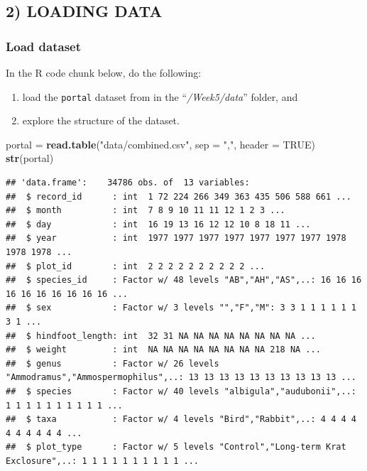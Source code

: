 \documentclass[]{article}
\newenvironment{Shaded}{\begin{snugshade}}{\end{snugshade}}
\newcommand{\KeywordTok}[1]{\textcolor[rgb]{0.13,0.29,0.53}{\textbf{{#1}}}}
\newcommand{\DataTypeTok}[1]{\textcolor[rgb]{0.13,0.29,0.53}{{#1}}}
\newcommand{\StringTok}[1]{\textcolor[rgb]{0.31,0.60,0.02}{{#1}}}
\newcommand{\OtherTok}[1]{\textcolor[rgb]{0.56,0.35,0.01}{{#1}}}
\newcommand{\NormalTok}[1]{{#1}}
\providecommand{\tightlist}{%
  \setlength{\itemsep}{0pt}\setlength{\parskip}{0pt}}
\begin{document}
\subsection{2) LOADING DATA}\label{loading-data}

\subsubsection{Load dataset}\label{load-dataset}

In the R code chunk below, do the following:

\begin{enumerate}
\def\labelenumi{\arabic{enumi}.}
\tightlist
\item
  load the \texttt{portal} dataset from in the ``\emph{/Week5/data}''
  folder, and
\item
  explore the structure of the dataset.
\end{enumerate}

\begin{Shaded}
\begin{Highlighting}[]
\NormalTok{portal =}\StringTok{ }\KeywordTok{read.table}\NormalTok{(}\StringTok{"data/combined.csv"}\NormalTok{, }\DataTypeTok{sep =} \StringTok{","}\NormalTok{, }\DataTypeTok{header =} \OtherTok{TRUE}\NormalTok{)}
\KeywordTok{str}\NormalTok{(portal)}
\end{Highlighting}
\end{Shaded}

\begin{verbatim}
## 'data.frame':    34786 obs. of  13 variables:
##  $ record_id      : int  1 72 224 266 349 363 435 506 588 661 ...
##  $ month          : int  7 8 9 10 11 11 12 1 2 3 ...
##  $ day            : int  16 19 13 16 12 12 10 8 18 11 ...
##  $ year           : int  1977 1977 1977 1977 1977 1977 1977 1978 1978 1978 ...
##  $ plot_id        : int  2 2 2 2 2 2 2 2 2 2 ...
##  $ species_id     : Factor w/ 48 levels "AB","AH","AS",..: 16 16 16 16 16 16 16 16 16 16 ...
##  $ sex            : Factor w/ 3 levels "","F","M": 3 3 1 1 1 1 1 1 3 1 ...
##  $ hindfoot_length: int  32 31 NA NA NA NA NA NA NA NA ...
##  $ weight         : int  NA NA NA NA NA NA NA NA 218 NA ...
##  $ genus          : Factor w/ 26 levels "Ammodramus","Ammospermophilus",..: 13 13 13 13 13 13 13 13 13 13 ...
##  $ species        : Factor w/ 40 levels "albigula","audubonii",..: 1 1 1 1 1 1 1 1 1 1 ...
##  $ taxa           : Factor w/ 4 levels "Bird","Rabbit",..: 4 4 4 4 4 4 4 4 4 4 ...
##  $ plot_type      : Factor w/ 5 levels "Control","Long-term Krat Exclosure",..: 1 1 1 1 1 1 1 1 1 1 ...
\end{verbatim}
\end{document}
